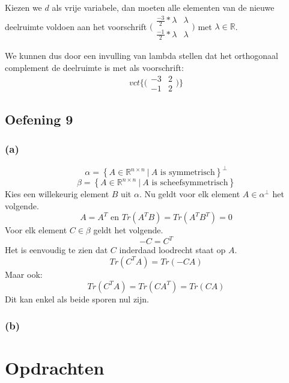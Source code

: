 \documentclass[lineaire_algebra_oplossingen.tex]{subfiles}
\begin{document}
Kiezen we $d$ als vrije variabele, dan moeten alle elementen van de nieuwe deelruimte voldoen aan het voorschrift $\bigl(\begin{smallmatrix}
\frac{-3}{2}*\lambda & \lambda \\
\frac{-1}{2}*\lambda & \lambda
\end{smallmatrix}\bigr)$ met $\lambda \in \mathbb{R}$.

We kunnen dus door een invulling van lambda stellen dat het orthogonaal complement de deelruimte is met als voorschrift:
\[
vct\{\bigl(\begin{smallmatrix}
-3 & 2 \\
-1 & 2
\end{smallmatrix}\bigr)\}
\]

\subsection{Oefening 9}
\subsubsection*{(a)}
\[
\alpha=
\left\{
A \in \mathbb{R}^{n\times n}\ |\ A \text{ is symmetrisch}
\right\}^\bot
\]
\[
\beta=
\left\{
A \in \mathbb{R}^{n\times n}\ |\ A \text{ is scheefsymmetrisch}
\right\}
\]
Kies een willekeurig element $B$ uit $\alpha$. Nu geldt voor elk element $A\in\alpha^\bot$ het volgende.
\[
A=A^T\text{ en } Tr(A^TB) = Tr(A^TB^T)= 0
\]
Voor elk element $C \in \beta$ geldt het volgende.
\[
-C = C^T
\]
Het is eenvoudig te zien dat $C$ inderdaad loodrecht staat op $A$.
\[
Tr(C^TA) = Tr(-CA)
\]
Maar ook:
\[
Tr(C^TA) = Tr(CA^T) = Tr(CA)
\]
Dit kan enkel als beide sporen nul zijn.


\subsubsection*{(b)}



\section{Opdrachten}
\end{document}
